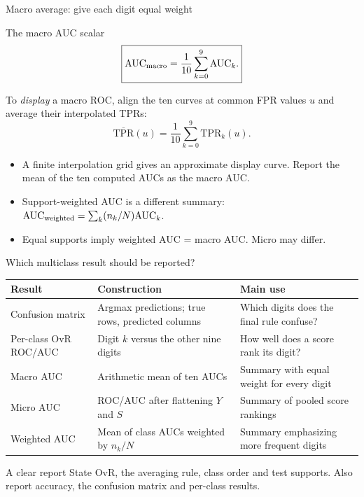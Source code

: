 \documentclass[aspectratio=169,11pt]{beamer}
\begin{document}
\begin{frame}{Macro average: give each digit equal weight}
\small
\setlength{\abovedisplayskip}{5pt}
\setlength{\belowdisplayskip}{5pt}
\begin{block}{The macro AUC scalar}
\[
 \boxed{\mathrm{AUC}_{\rm macro}
       =\frac1{10}\sum_{k=0}^{9}\mathrm{AUC}_k.}
\]
\end{block}
To \emph{display} a macro ROC, align the ten curves at common FPR values $u$
and average their interpolated TPRs:
\[
 \overline{\mathrm{TPR}}(u)
   =\frac1{10}\sum_{k=0}^{9}\mathrm{TPR}_k(u).
\]
\begin{itemize}
\item A finite interpolation grid gives an approximate display curve.
      Report the mean of the ten computed AUCs as the macro AUC.
\item Support-weighted AUC is a different summary:
      $\mathrm{AUC}_{\rm weighted}=\sum_k(n_k/N)\mathrm{AUC}_k$.
\item Equal supports imply weighted AUC = macro AUC. Micro may differ.
\end{itemize}
\end{frame}

\begin{frame}{Which multiclass result should be reported?}
\small
\renewcommand{\arraystretch}{1.1}
\begin{tabular}{p{2.8cm}p{5.0cm}p{5.3cm}}
\toprule
Result & Construction & Main use\\\midrule
Confusion matrix & Argmax predictions; true rows, predicted columns &
Which digits does the final rule confuse?\\
Per-class OvR ROC/AUC & Digit $k$ versus the other nine digits &
How well does a score rank its digit?\\
Macro AUC & Arithmetic mean of ten AUCs &
Summary with equal weight for every digit\\
Micro AUC & ROC/AUC after flattening $Y$ and $S$ &
Summary of pooled score rankings\\
Weighted AUC & Mean of class AUCs weighted by $n_k/N$ &
Summary emphasizing more frequent digits\\\bottomrule
\end{tabular}
\vspace{.3em}
\begin{block}{A clear report}
State OvR, the averaging rule, class order and test supports.
Also report accuracy, the confusion matrix and per-class results.
\end{block}
\end{frame}
\end{document}
